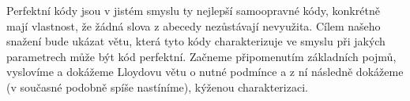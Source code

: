 \documentclass[a4paper,12pt,titlepage]{article}
\begin{document}
Perfektní kódy jsou v jistém smyslu ty nejlepší samoopravné kódy, konkrétně mají vlastnost, že žádná slova z abecedy nezůstávají nevyužita. Cílem našeho snažení bude ukázat větu, která tyto kódy charakterizuje ve smyslu při jakých parametrech může být kód perfektní. Začneme připomenutím základních pojmů, vyslovíme a dokážeme Lloydovu větu o nutné podmínce a z ní následně dokážeme (v současné podobně spíše nastíníme), kýženou charakterizaci.








\end{document}
